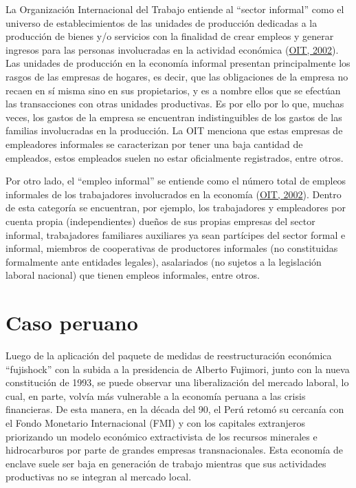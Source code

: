 \documentclass[
  letterpaper,
  12pt,
  oneside,
  spanish,
  doublespacing,
  headsepline,
  parskip]{MastersDoctoralThesis}
\begin{document}
La Organización Internacional del Trabajo entiende al ``sector
informal'' como el universo de establecimientos de las unidades de
producción dedicadas a la producción de bienes y/o servicios con la
finalidad de crear empleos y generar ingresos para las personas
involucradas en la actividad económica
(\protect\hyperlink{ref-oit2002}{OIT, 2002}). Las unidades de producción
en la economía informal presentan principalmente los rasgos de las
empresas de hogares, es decir, que las obligaciones de la empresa no
recaen en sí misma sino en sus propietarios, y es a nombre ellos que se
efectúan las transacciones con otras unidades productivas. Es por ello
por lo que, muchas veces, los gastos de la empresa se encuentran
indistinguibles de los gastos de las familias involucradas en la
producción. La OIT menciona que estas empresas de empleadores informales
se caracterizan por tener una baja cantidad de empleados, estos
empleados suelen no estar oficialmente registrados, entre otros.

Por otro lado, el ``empleo informal'' se entiende como el número total
de empleos informales de los trabajadores involucrados en la economía
(\protect\hyperlink{ref-oit2002}{OIT, 2002}). Dentro de esta categoría
se encuentran, por ejemplo, los trabajadores y empleadores por cuenta
propia (independientes) dueños de sus propias empresas del sector
informal, trabajadores familiares auxiliares ya sean partícipes del
sector formal e informal, miembros de cooperativas de productores
informales (no constituidas formalmente ante entidades legales),
asalariados (no sujetos a la legislación laboral nacional) que tienen
empleos informales, entre otros.

\hypertarget{caso-peruano}{%
\section{Caso peruano}\label{caso-peruano}}

Luego de la aplicación del paquete de medidas de reestructuración
económica ``fujishock'' con la subida a la presidencia de Alberto
Fujimori, junto con la nueva constitución de 1993, se puede observar una
liberalización del mercado laboral, lo cual, en parte, volvía más
vulnerable a la economía peruana a las crisis financieras. De esta
manera, en la década del 90, el Perú retomó su cercanía con el Fondo
Monetario Internacional (FMI) y con los capitales extranjeros
priorizando un modelo económico extractivista de los recursos minerales
e hidrocarburos por parte de grandes empresas transnacionales. Esta
economía de enclave suele ser baja en generación de trabajo mientras que
sus actividades productivas no se integran al mercado local.
\end{document}
